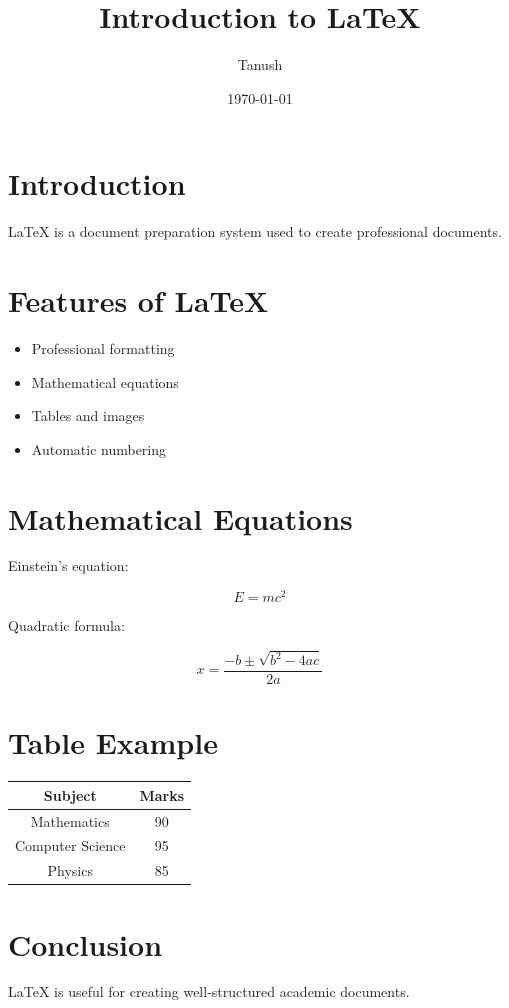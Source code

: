 \documentclass[12pt,a4paper]{article}
\title{Introduction to LaTeX}
\author{Tanush}
\date{\today}
\begin{document}
\maketitle

\section{Introduction}

LaTeX is a document preparation system
used to create professional documents.

\section{Features of LaTeX}

\begin{itemize}
    \item Professional formatting
    \item Mathematical equations
    \item Tables and images
    \item Automatic numbering
\end{itemize}

\section{Mathematical Equations}

Einstein's equation:

\[
E = mc^2
\]

Quadratic formula:

\[
x = \frac{-b \pm \sqrt{b^2-4ac}}{2a}
\]

\section{Table Example}

\begin{center}
\begin{tabular}{|c|c|}
\hline
Subject & Marks \\
\hline
Mathematics & 90 \\
Computer Science & 95 \\
Physics & 85 \\
\hline
\end{tabular}
\end{center}

\section{Conclusion}

LaTeX is useful for creating
well-structured academic documents.
\end{document}
